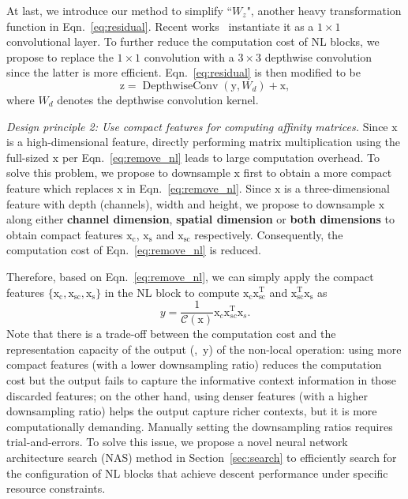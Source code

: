 \documentclass[10pt,twocolumn,letterpaper]{article}
\newcommand{\ma}[1]{\mathrm{#1}} \newcommand{\songbai}[1]{ \textcolor{red}{(song bai: #1)}  }
\begin{document}
At last, we introduce our method to simplify ``$W_z$", another heavy
transformation function in Eqn.~\eqref{eq:residual}. 
Recent works~\cite{wang2018non} instantiate it as a $1\times1$ convolutional layer. To further reduce the computation cost of NL blocks, we propose to replace the $1\times1$ convolution with a $3\times 3$ depthwise convolution~\cite{howard2017mobilenets} since the latter is more efficient. Eqn.~\eqref{eq:residual} is then modified to be
\begin{equation} \label{eq:depthwise}
    \ma{z} = \operatorname{DepthwiseConv}(\ma{y}, W_d) + \ma{x},
\end{equation}
where $W_d$ denotes the depthwise convolution kernel. 

\vspace{0.5ex}\noindent\textit{Design principle 2: Use compact features for computing affinity matrices.}
Since $\ma{x}$ is a high-dimensional feature, directly performing matrix multiplication using the full-sized $\ma{x}$ per Eqn.~\eqref{eq:remove_nl} leads to large computation overhead. To solve this problem, we propose to downsample $\ma{x}$ first to obtain a more compact feature which replaces $\ma{x}$ in Eqn.~\eqref{eq:remove_nl}. Since $\ma{x}$ is a three-dimensional feature with depth  (channels), width and height, 
we propose to downsample $\ma{x}$ along either \textbf{channel dimension}, \textbf{spatial dimension} or \textbf{both dimensions} to obtain compact features $\ma{x_c}$, $\ma{x_s}$ and $\ma{x_{sc}}$ respectively. Consequently, the computation cost of Eqn.~\eqref{eq:remove_nl} is reduced.

Therefore, based on Eqn.~\eqref{eq:remove_nl}, we can simply apply the compact features $\{\ma{x_c}, \ma{x_{sc}}, \ma{x_s}\}$ in the NL block to compute $\ma{x_c}\ma{x_{sc}^T}$ and $\ma{x_{sc}^T}\ma{x_s}$ as
\begin{equation} \label{eq:compact_nl}
    y=\frac{1}{\mathcal{C}(\ma{x})}\ma{x}_c \ma{x}_{sc}^\mathrm{T}\ma{x}_s.
\end{equation}
Note that there is a trade-off between the computation cost and the representation capacity of the output (\ie,~$\ma{y}$) of the non-local operation: using more compact features (with a lower downsampling ratio) reduces the computation cost but the output fails to capture the informative context information in those discarded features; on the other hand, using denser features (with a higher downsampling ratio) helps the output capture richer contexts, but it is more computationally demanding. Manually setting the downsampling ratios requires trial-and-errors. To solve this issue, we propose a novel neural network architecture search (NAS) method in Section~\ref{sec:search} to efficiently search for the configuration of NL blocks that achieve descent performance under specific resource constraints. 
\end{document}
